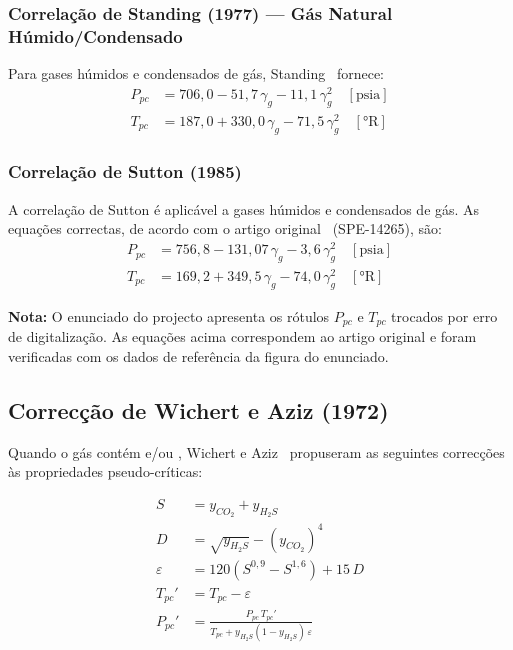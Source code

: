 \documentclass[12pt,a4paper]{article}
\begin{document}
\subsubsection{Correlação de Standing (1977) — Gás Natural Húmido/Condensado}

Para gases húmidos e condensados de gás, Standing~\cite{Standing1977} fornece:
\begin{align}
  P_{pc} &= 706{,}0 - 51{,}7\,\gamma_g - 11{,}1\,\gamma_g^2 \quad [\text{psia}]\\
  T_{pc} &= 187{,}0 + 330{,}0\,\gamma_g - 71{,}5\,\gamma_g^2 \quad [°\text{R}]
\end{align}

\subsubsection{Correlação de Sutton (1985)}

A correlação de Sutton é aplicável a gases húmidos e condensados de gás.
As equações correctas, de acordo com o artigo original~\cite{Sutton1985} (SPE-14265), são:
\begin{align}
  P_{pc} &= 756{,}8 - 131{,}07\,\gamma_g - 3{,}6\,\gamma_g^2 \quad [\text{psia}]\\
  T_{pc} &= 169{,}2 + 349{,}5\,\gamma_g - 74{,}0\,\gamma_g^2 \quad [°\text{R}]
\end{align}

\textbf{Nota:} O enunciado do projecto apresenta os rótulos $P_{pc}$ e $T_{pc}$
trocados por erro de digitalização. As equações acima correspondem ao artigo
original e foram verificadas com os dados de referência da figura do enunciado.

\subsection{Correcção de Wichert e Aziz (1972)}

Quando o gás contém  e/ou , Wichert e Aziz~\cite{WichertAziz1972} propuseram as seguintes correcções às propriedades pseudo-críticas:

\begin{align}
  S &= y_{CO_2} + y_{H_2S} \\
  D &= \sqrt{y_{H_2S}} - \left(y_{CO_2}\right)^4 \\
  \varepsilon &= 120\left(S^{0{,}9} - S^{1{,}6}\right) + 15\,D \\
  T_{pc}' &= T_{pc} - \varepsilon \\
  P_{pc}' &= \frac{P_{pc}\,T_{pc}'}{T_{pc} + y_{H_2S}(1-y_{H_2S})\,\varepsilon}
\end{align}
\end{document}
